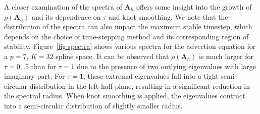 \documentclass[preprint,10pt]{elsarticle}
\newcommand{\reviewerOne}[1]{#1}
\begin{document}
\reviewerOne{A closer examination of the spectra of $\bm{A}_h$ offers some insight into the growth of $\rho(\bm{A}_h)$ and its dependence on $\tau$ and knot smoothing.  We note that the distribution of the spectra can also impact the maximum stable timestep, which depends on the choice of time-stepping method and its corresponding region of stability.  
Figure~\ref{fig:spectra} shows various spectra for the advection equation for a $p=7$, $K=32$ spline space.  It can be observed that $\rho(\bm{A}_h)$ is much larger for $\tau = 0, .5$ than for $\tau = 1$ due to the presence of two outlying eigenvalues with large imaginary part.  For $\tau = 1$, these extremal eigenvalues fall into a tight semi-circular distribution in the left half plane, resulting in a significant reduction in the spectral radius.  When knot smoothing is applied, the eigenvalues contract into a semi-circular distribution of slightly smaller radius.}
\end{document}
